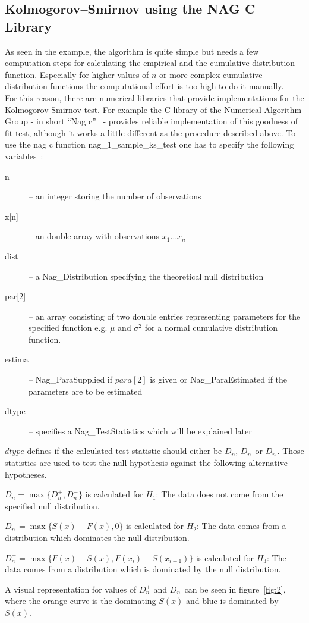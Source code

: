 \documentclass{article}
\theoremstyle{definition}
\begin{document}
\subsection{Kolmogorov–Smirnov using the NAG C Library}
As seen in the example, the algorithm is quite simple but needs a few computation steps for calculating the empirical and the cumulative distribution function.
Especially for higher values of $n$ or more complex cumulative distribution functions the computational effort is too high to do it manually.\\
For this reason, there are numerical libraries that provide implementations for the Kolmogorov-Smirnov test. For example the C library of the Numerical Algorithm Group - in short ``Nag c''~\cite{nagc} - provides reliable implementation of this goodness of fit test, although it works a little different as the procedure described above.
To use the nag c function nag\_1\_sample\_ks\_test one has to specify the following variables~\cite{nagcKS}:
\begin{description}
\item[n] -- an integer storing the number of observations
\item[x{[n]}] -- an double array with observations $x_1 … x_n$
\item[dist] -- a Nag\_Distribution specifying the theoretical null distribution
\item[par{[2]}] -- an array consisting of two double entries representing parameters for the specified function e.g. $\mu$ and $\sigma^2$ for a normal cumulative distribution function.
\item[estima] -- Nag\_ParaSupplied if $para[2]$ is given or Nag\_ParaEstimated if the parameters are to be estimated
\item[dtype] -- specifies a Nag\_TestStatistics which will be explained later
\end{description}
$dtype$ defines if the calculated test statistic should either be $D_n$, $D^+_n$ or $D^-_n$.
Those statistics are used to test the null hypothesis against the following alternative hypotheses.
\begin{description}
\item $D_n=\max\{D^+_n,D^-_n\}$ is calculated for $H_1 $: The data does not come from the specified null distribution.\\
\item $D^+_n=\max\{S(x)-F(x),0\}$ is calculated for $H_2$: The data comes from a distribution which dominates the null distribution.\\
\item $D^-_n=\max\{F(x)-S(x),F(x_i)-S(x_{i-1})\}$ is calculated for $H_3$: The data comes from a distribution which is dominated by the null distribution.\\
\end{description}
A visual representation for values of $D_n^+$ and $D_n^-$ can be seen in figure~\ref{fig:2}, where the orange curve is the dominating $S(x)$ and blue is dominated by $S(x)$.
\end{document}
